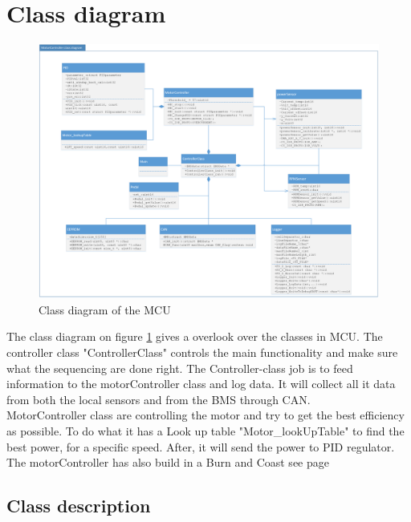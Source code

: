 \newpage
\section{Class diagram}
\label{sec:class_diagram}

\begin{figure}[H]
	\centering
	\includegraphics [width=6in]{Software/Pictures/class-diagram.png}
	\caption{Class diagram of the MCU}
	\label{fig:Class_diagram_MCU}
\end{figure}

The class diagram on figure \ref{fig:Class_diagram_MCU} gives a overlook over the classes in MCU. The controller class "ControllerClass" controls the main functionality and make sure what the sequencing are done right. The Controller-class job is to feed information to the motorController class and log data. It will collect all it data from both the local sensors and from the BMS through CAN.\\
MotorController class are controlling the motor and try to get the best efficiency as possible. To do what it has a Look up table "Motor\_lookUpTable" to find the best power, for a specific speed. After, it will send the power to PID regulator. The motorController has also build in a Burn and Coast see page \pageref{sec:Coast_and_Burn}\\ 

\subsection{Class description}

